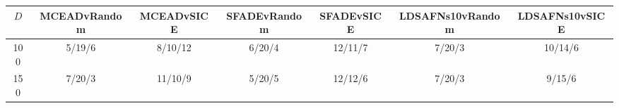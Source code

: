 \begin{tabular}{c c c c c c c}\hline\hline
	$D$	&	MCEADvRandom	&	MCEADvSICE	&	SFADEvRandom	&	SFADEvSICE	&	LDSAFNs10vRandom	&	LDSAFNs10vSICE	\\ \hline
	100	&	5/19/6	&	8/10/12	&	6/20/4	&	12/11/7	&	7/20/3	&	10/14/6	\\
	150	&	7/20/3	&	11/10/9	&	5/20/5	&	12/12/6	&	7/20/3	&	9/15/6	\\ \hline
\end{tabular}